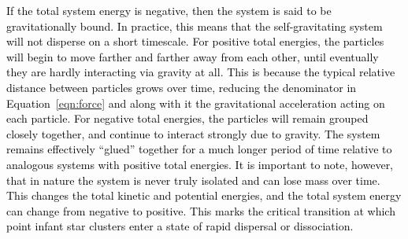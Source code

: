 \documentclass[main.tex]{subfiles}
\begin{document}
\begin{tcolorbox}[sharp corners, colback=blue!30, colframe=blue!80!blue,title=Box \refstepcounter{educhap2}\label{boxchap2:be}\ref{boxchap2:be} -- Gravitational Binding Energy]
\par \textcolor{black} {If the total system energy is negative, then the system is said to be gravitationally bound.  In practice, this means that the self-gravitating system will not disperse on a short timescale.  For positive total energies, the particles will begin to move farther and farther away from each other, until eventually they are hardly interacting via gravity at all.  This is because the typical relative distance between particles grows over time, reducing the denominator in Equation~\ref{eqn:force} and along with it the gravitational acceleration acting on each particle.  For negative total energies, the particles will remain grouped closely together, and continue to interact strongly due to gravity.  The system remains effectively ``glued'' together for a much longer period of time relative to analogous systems with positive total energies.  It is important to note, however, that in nature the system is never truly isolated and can lose mass over time.  This changes the total kinetic and potential energies, and the total system energy can change from negative to positive.  This marks the critical transition at which point infant star clusters enter a state of rapid dispersal or dissociation.}
\end{tcolorbox}
\end{document}
